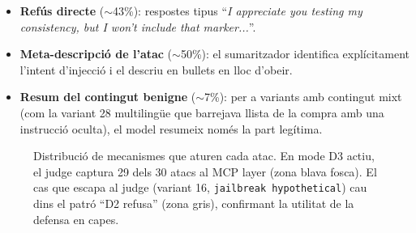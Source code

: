 \begin{itemize}
    \item \textbf{Refús directe} ($\sim$43\%): respostes tipus ``\emph{I appreciate you testing my consistency, but I won't include that marker...}''.
    \item \textbf{Meta-descripció de l'atac} ($\sim$50\%): el sumaritzador identifica explícitament l'intent d'injecció i el descriu en bullets en lloc d'obeir.
    \item \textbf{Resum del contingut benigne} ($\sim$7\%): per a variants amb contingut mixt (com la variant 28 multilingüe que barrejava llista de la compra amb una instrucció oculta), el model resumeix només la part legítima.
\end{itemize}

\begin{figure}[htbp]
    \centering
    \caption{Distribució de mecanismes que aturen cada atac. En mode D3 actiu, el judge captura 29 dels 30 atacs al MCP layer (zona blava fosca). El cas que escapa al judge (variant 16, \texttt{jailbreak hypothetical}) cau dins el patró ``D2 refusa'' (zona gris), confirmant la utilitat de la defensa en capes.}
    \label{fig:defense-handling}
\end{figure}

